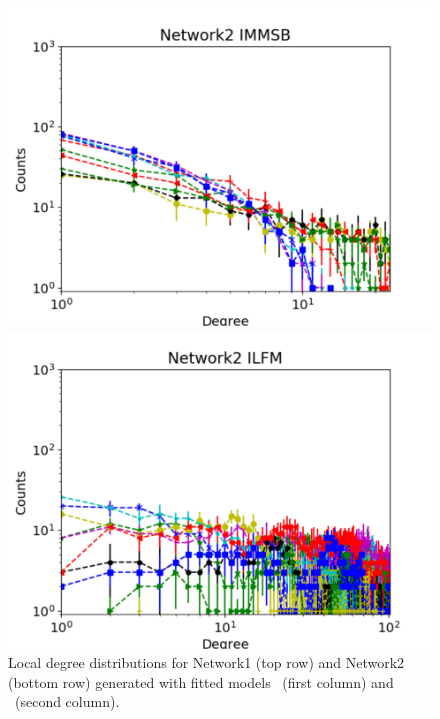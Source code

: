 \begin{figure}[h]
\begin{minipage}{0.4\textwidth}
        \includegraphics[width=\textwidth]{img/corpus/immsb_network2_1}
    \end{minipage}
    \begin{minipage}{0.4\textwidth}
        \includegraphics[width=\textwidth]{img/corpus/ilfm_network2_1}
    \end{minipage}
    \caption {Local degree distributions for Network1 (top row) and Network2 (bottom row) generated with fitted models \imb\ (first column) and \ifm\ (second column).} 
\label{fig:me_local}
\end{figure}

